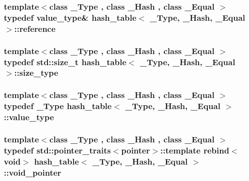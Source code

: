 \subsubsection[{reference}]{\setlength{\rightskip}{0pt plus 5cm}template$<$class \+\_\+\+Type , class \+\_\+\+Hash , class \+\_\+\+Equal $>$ typedef {\bf value\+\_\+type}\& {\bf hash\+\_\+table}$<$ \+\_\+\+Type, \+\_\+\+Hash, \+\_\+\+Equal $>$\+::{\bf reference}}\label{classhash__table_a92ee06d8c071e7a5b41861d2622e02de}
\hypertarget{classhash__table_a8d85f5b55ee3116e6d40c1de62e62368}{}
\subsubsection[{size\+\_\+type}]{\setlength{\rightskip}{0pt plus 5cm}template$<$class \+\_\+\+Type , class \+\_\+\+Hash , class \+\_\+\+Equal $>$ typedef std\+::size\+\_\+t {\bf hash\+\_\+table}$<$ \+\_\+\+Type, \+\_\+\+Hash, \+\_\+\+Equal $>$\+::{\bf size\+\_\+type}}\label{classhash__table_a8d85f5b55ee3116e6d40c1de62e62368}
\hypertarget{classhash__table_a536a4f7db0e47e35283f8e04ea72e88c}{}
\subsubsection[{value\+\_\+type}]{\setlength{\rightskip}{0pt plus 5cm}template$<$class \+\_\+\+Type , class \+\_\+\+Hash , class \+\_\+\+Equal $>$ typedef \+\_\+\+Type {\bf hash\+\_\+table}$<$ \+\_\+\+Type, \+\_\+\+Hash, \+\_\+\+Equal $>$\+::{\bf value\+\_\+type}}\label{classhash__table_a536a4f7db0e47e35283f8e04ea72e88c}
\hypertarget{classhash__table_a46df0d3f55f71d07f275abebec698098}{}
\subsubsection[{void\+\_\+pointer}]{\setlength{\rightskip}{0pt plus 5cm}template$<$class \+\_\+\+Type , class \+\_\+\+Hash , class \+\_\+\+Equal $>$ typedef std\+::pointer\+\_\+traits$<${\bf pointer}$>$\+::template rebind$<$void$>$ {\bf hash\+\_\+table}$<$ \+\_\+\+Type, \+\_\+\+Hash, \+\_\+\+Equal $>$\+::{\bf void\+\_\+pointer}}\label{classhash__table_a46df0d3f55f71d07f275abebec698098}


